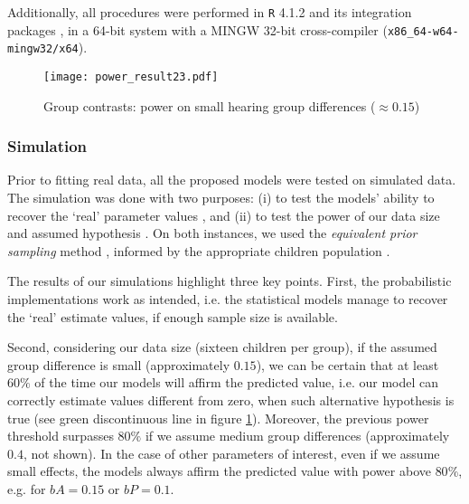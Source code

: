 Additionally, all procedures were performed in \texttt{R} 4.1.2 \citep{R_2015} and its integration packages \citep{RStan_2020}, in a 64-bit system with a MINGW 32-bit cross-compiler (\texttt{x86\_64-w64-mingw32/x64}).

\begin{comment}
	\footnote{see \citet{Rivera_2021} (p. 11-13, 15-27) for a detailed description of its benefits and shortcomings.}
\end{comment}
%
%
\begin{figure}[!h]
	\centering
	\texttt{[image: power\_result23.pdf]}
	\caption[Group contrasts: power on small hearing group differences]{Group contrasts: power on small hearing group differences ($\approx 0.15$)}
	\label{fig:contrasts}
\end{figure}
%
%
\subsubsection{Simulation} \label{ssSA:model_simulation}
%
Prior to fitting real data, all the proposed models were tested on simulated data. The simulation was done with two purposes: (i) to test the models' ability to recover the `real' parameter values \cite{Fogarty_et_al_2022}, and (ii) to test the power of our data size and assumed hypothesis \cite{Kruschke_2015}. On both instances, we used the \textit{equivalent prior sampling} method \cite{Winkler_1967}, informed by the appropriate children population \cite{DeRaeve_2016}. 

\begin{comment}
	Moreover, we tested three goals\footnote{see \citet{Kruschke_2015} chapter 13 for a detailed overview of the method.}: (a) reject the null value of a parameter, (b) affirm a predicted value, and (c) achieve an estimate precision.
\end{comment}

The results of our simulations highlight three key points. First, the probabilistic implementations work as intended, i.e. the statistical models manage to recover the `real' estimate values, if enough sample size is available. 

Second, considering our data size (sixteen children per group), if the assumed group difference is small (approximately $0.15$), we can be certain that at least $60\%$ of the time our models will affirm the predicted value, i.e. our model can correctly estimate values different from zero, when such alternative hypothesis is true (see green discontinuous line in figure \ref{fig:contrasts}). Moreover, the previous power threshold surpasses $80\%$ if we assume medium group differences (approximately $0.4$, not shown). In the case of other parameters of interest, even if we assume small effects, the models always affirm the predicted value with power above $80\%$, e.g. for $bA=0.15$ or $bP=0.1$.

